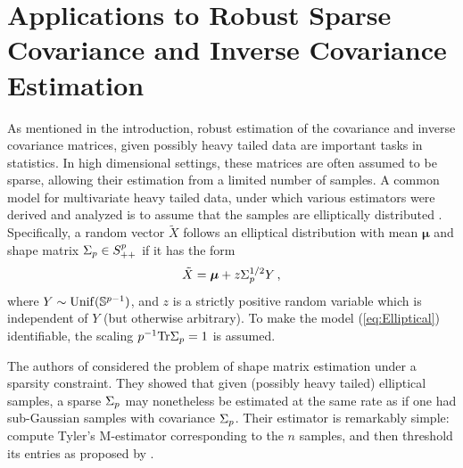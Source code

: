 \documentclass[times,sort&compress,3p]{elsarticle}
\begin{document}
\section{Applications to Robust Sparse Covariance and Inverse Covariance Estimation}
\label{sec:app-covariance-est}




As mentioned in the introduction, 
robust estimation of the covariance and inverse covariance matrices, given possibly heavy tailed data are important tasks in statistics. In high dimensional settings, these matrices are often assumed to be sparse, allowing their estimation from a limited number of samples. 
%
A common model for multivariate heavy tailed data, under which various estimators were derived and analyzed is to assume that the samples are elliptically distributed \cite{kelker1970distribution,cambanis1981theory,frahm2004generalized,fang2018symmetric}.
Specifically, 
a random vector $\tilde{X}$ follows an elliptical distribution with mean $\bm{\mu}$ and shape matrix $\Sigma_p \in S^p_{++}$ if it has the form
\begin{equation}
        \label{eq:Elliptical}
        \tilde{X} =  \bm{\mu} + z\Sigma_p^{1/2}Y \,,
\end{equation}
where $Y \sim \mathrm{Unif}(\mathbb{S}^{p-1})$, 
and $z$ is a strictly positive random variable which is {independent} of $Y$ (but otherwise arbitrary). To make the model (\ref{eq:Elliptical}) identifiable, the scaling $p^{-1}\textrm{Tr}\Sigma_p = 1$ is assumed.  

The authors of \cite{goes2017robust} considered the problem of shape matrix estimation under a sparsity constraint. They showed
that given (possibly heavy tailed)
elliptical samples, a sparse
$\Sigma_p$ may nonetheless be estimated at the same rate as if one had sub-Gaussian samples with covariance $\Sigma_p$. Their estimator is remarkably simple: compute Tyler's M-estimator  corresponding to the $n$ samples, and then threshold its entries as proposed by \cite{bickel2008covariance}. 
\end{document}
